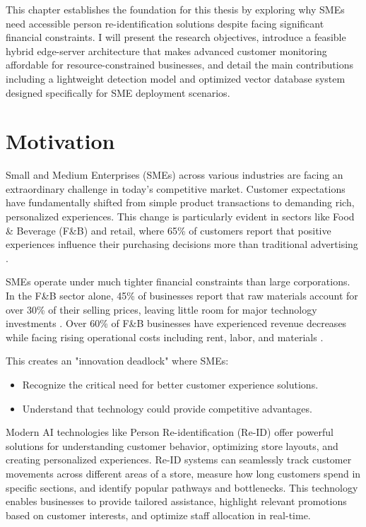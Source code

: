 \documentclass[../main.tex]{subfiles}
\begin{document}
This chapter establishes the foundation for this thesis by exploring why SMEs need accessible person re-identification solutions despite facing significant financial constraints. I will present the research objectives, introduce a feasible hybrid edge-server architecture that makes advanced customer monitoring affordable for resource-constrained businesses, and detail the main contributions including a lightweight detection model and optimized vector database system designed specifically for SME deployment scenarios.


\section{Motivation}
\label{sec:motivation}

Small and Medium Enterprises (SMEs) across various industries are facing an extraordinary challenge in today's competitive market. Customer expectations have fundamentally shifted from simple product transactions to demanding rich, personalized experiences. This change is particularly evident in sectors like Food \& Beverage (F\&B) and retail, where 65\% of customers report that positive experiences influence their purchasing decisions more than traditional advertising \cite{customer_experience}.

SMEs operate under much tighter financial constraints than large corporations. In the F\&B sector alone, 45\% of businesses report that raw materials account for over 30\% of their selling prices, leaving little room for major technology investments \cite{customer_experience2}. Over 60\% of F\&B businesses have experienced revenue decreases while facing rising operational costs including rent, labor, and materials \cite{customer_experience3}.

This creates an "innovation deadlock" where SMEs:
\begin{itemize}
    \item Recognize the critical need for better customer experience solutions.
    \item Understand that technology could provide competitive advantages.
\end{itemize}

Modern AI technologies like Person Re-identification (Re-ID) offer powerful solutions for understanding customer behavior, optimizing store layouts, and creating personalized experiences. Re-ID systems can seamlessly track customer movements across different areas of a store, measure how long customers spend in specific sections, and identify popular pathways and bottlenecks. This technology enables businesses to provide tailored assistance, highlight relevant promotions based on customer interests, and optimize staff allocation in real-time.
\end{document}
